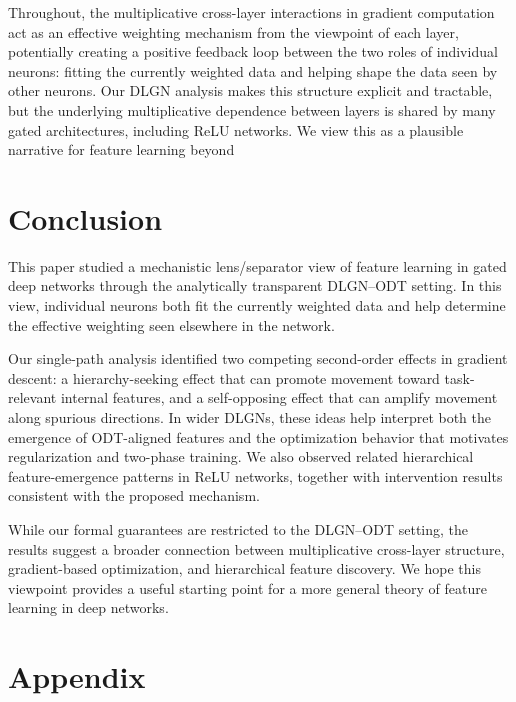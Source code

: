 \documentclass{article}
\theoremstyle{plain}
\theoremstyle{definition}
\theoremstyle{remark}
\newcommand{\1}{{\mathbf 1}}
\newcommand{\0}{{\mathbf 0}}
\renewcommand{\>}{{\rightarrow}}
\begin{document}
Throughout, the multiplicative cross-layer interactions in gradient computation act as an effective weighting mechanism from the viewpoint of each layer, potentially creating a positive feedback loop between the two roles of individual neurons: fitting the currently weighted data and helping shape the data seen by other neurons. Our DLGN analysis makes this structure explicit and tractable, but the underlying multiplicative dependence between layers is shared by many gated architectures, including ReLU networks. We view this as a plausible narrative for feature learning beyond 





\section{Conclusion}

This paper studied a mechanistic lens/separator view of feature learning in gated deep networks through the analytically transparent DLGN--ODT setting. In this view, individual neurons both fit the currently weighted data and help determine the effective weighting seen elsewhere in the network. 

Our single-path analysis identified two competing second-order effects in gradient descent: a hierarchy-seeking effect that can promote movement toward task-relevant internal features, and a self-opposing effect that can amplify movement along spurious directions. In wider DLGNs, these ideas help interpret both the emergence of ODT-aligned features and the optimization behavior that motivates regularization and two-phase training. We also observed related hierarchical feature-emergence patterns in ReLU networks, together with intervention results consistent with the proposed mechanism.

While our formal guarantees are restricted to the DLGN--ODT setting, the results suggest a broader connection between multiplicative cross-layer structure, gradient-based optimization, and hierarchical feature discovery. We hope this viewpoint provides a useful starting point for a more general theory of feature learning in deep networks.

\small


\normalsize

\section{Appendix}
\end{document}
